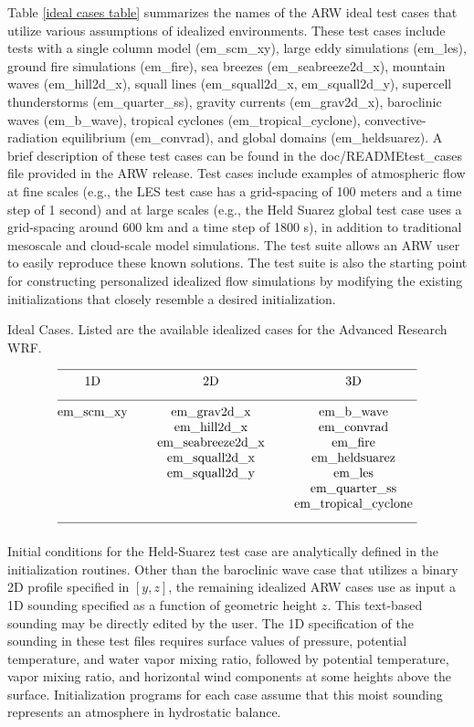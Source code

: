 Table \ref {ideal cases table} summarizes the names of the ARW ideal test cases that
utilize various assumptions of idealized environments.
These test cases include
tests with a single column model (em\_scm\_xy), 
large eddy simulations (em\_les), ground fire simulations (em\_fire),
sea breezes (em\_seabreeze2d\_x), mountain waves (em\_hill2d\_x), squall lines
(em\_squall2d\_x, em\_squall2d\_y), supercell thunderstorms
(em\_quarter\_ss), gravity currents (em\_grav2d\_x), baroclinic
waves (em\_b\_wave), tropical cyclones (em\_tropical\_cyclone), 
convective-radiation equilibrium (em\_convrad), and 
global domains (em\_heldsuarez).  
A brief description of these test cases can be
found in the doc/README\.test\_cases file provided in the ARW release.
Test cases include examples of atmospheric
flow at fine scales (e.g., the LES test case has a grid-spacing of
100 meters and a time step of 1 second) and at large
scales (e.g., the Held Suarez global test case uses a grid-spacing around 600 km and
a time step of 1800 s), in addition to traditional mesoscale and
cloud-scale model simulations.  The test suite allows an ARW user to
easily reproduce these known solutions.  The test suite is also the
starting point for constructing personalized idealized flow simulations by modifying
the existing initializations that closely resemble a desired initialization.

\begin{table}
\caption{Ideal Cases. Listed are the available idealized cases for the Advanced Research WRF.}
\label{ideal cases table}
$$\vbox
{\halign{\hfil#\hfil \qquad & \hfil#\hfil \qquad & \hfil#\hfil \cr
\multispan3\hrulefill \cr
 1D             & 2D                  & 3D                    \cr
\multispan3\hrulefill \cr
em\_scm\_xy     &  em\_grav2d\_x      & em\_b\_wave           \cr
                &  em\_hill2d\_x      & em\_convrad           \cr
                &  em\_seabreeze2d\_x & em\_fire              \cr
                &  em\_squall2d\_x    & em\_heldsuarez      \cr
                &  em\_squall2d\_y    & em\_les               \cr
                &                     & em\_quarter\_ss       \cr
                &                     & em\_tropical\_cyclone \cr
\multispan3\hrulefill \cr
}}$$
\end{table}

Initial conditions for the Held-Suarez test case are analytically
defined in the initialization routines. Other than the baroclinic wave case
that utilizes a binary 2D profile specified in $[y,z]$, the remaining
idealized ARW cases use as input a 1D sounding specified as a function of
geometric height $z$. This text-based sounding may be
directly edited by the user.  
The 1D specification of the sounding in
these test files requires surface values of pressure, potential
temperature, and water vapor mixing ratio, followed by potential
temperature, vapor mixing ratio, and horizontal wind components at some
heights above the surface.  Initialization programs for each case
assume that this moist sounding represents an atmosphere in hydrostatic
balance.

